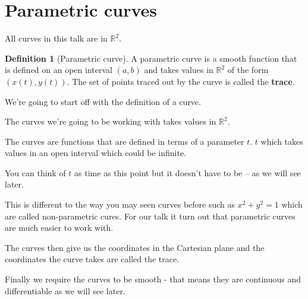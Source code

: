 \documentclass[12pt]{article} %
\theoremstyle{definition}
\newtheorem{definition}{Definition}[section]
\theoremstyle{theorem}
\begin{document}
\section{Parametric curves}
\begin{tcolorbox}
	All curves in this talk are in $\mathbb{R}^2$.
	\begin{definition}[Parametric curve]
		A parametric curve is a smooth function that is defined on an open interval $(a, b)$ and takes values in $\mathbb{R}^2$ of the form $(x(t), y(t))$.
		\newline
		The set of points traced out by the curve is called the \textbf{trace}.
	\end{definition}
\end{tcolorbox}

We're going to start off with the definition of a curve. 

The curves we’re going to be working with takes values in $\mathbb{R}^2$.
 
The curves are functions that are defined in terms of a parameter $t$. $t$ which takes values in an open interval which could be infinite.

You can think of $t$ as time as this point but it doesn’t have to be -- as we will see later. 

This is different to the way you may seen curves before such as $x^2 + y^2 = 1$ which are called non-parametric cures. For our talk it turn out that parametric curves are much easier to work with.

The curves then give us the coordinates in the Cartesian plane and the coordinates the curve takes are called the trace.

Finally we require the curves to be smooth - that means they are continuous and differentiable as we will see later. 
\end{document}
